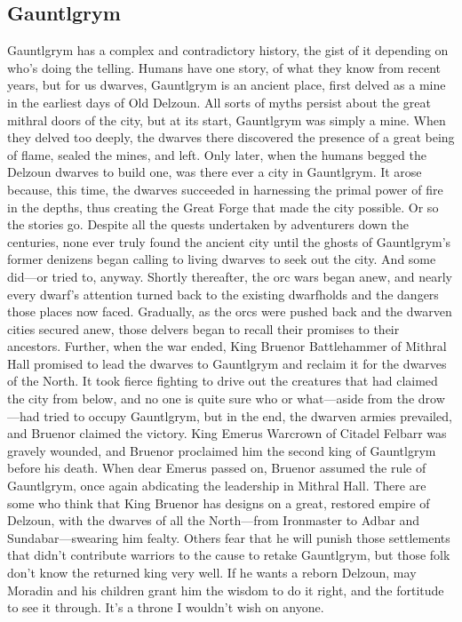 \documentclass[10pt,a4paper,twoside,twocolumn,openany,bg=print,nodeprecatedcode]{dndbook}
\begin{document}
\subsection{Gauntlgrym}
Gauntlgrym has a complex and contradictory history, the gist of it depending on who's doing the telling. Humans have one story, of what they know from recent years, but for us dwarves, Gauntlgrym is an ancient place, first delved as a mine in the earliest days of Old Delzoun. All sorts of myths persist about the great mithral doors of the city, but at its start, Gauntlgrym was simply a mine. When they delved too deeply, the dwarves there discovered the presence of a great being of flame, sealed the mines, and left. Only later, when the humans begged the Delzoun dwarves to build one, was there ever a city in Gauntlgrym. It arose because, this time, the dwarves succeeded in harnessing the primal power of fire in the depths, thus creating the Great Forge that made the city possible. Or so the stories go.
Despite all the quests undertaken by adventurers down the centuries, none ever truly found the ancient city until the ghosts of Gauntlgrym's former denizens began calling to living dwarves to seek out the city. And some did—or tried to, anyway. Shortly thereafter, the orc wars began anew, and nearly every dwarf's attention turned back to the existing dwarfholds and the dangers those places now faced. Gradually, as the orcs were pushed back and the dwarven cities secured anew, those delvers began to recall their promises to their ancestors. Further, when the war ended, King Bruenor Battlehammer of Mithral Hall promised to lead the dwarves to Gauntlgrym and reclaim it for the dwarves of the North.
It took fierce fighting to drive out the creatures that had claimed the city from below, and no one is quite sure who or what—aside from the drow—had tried to occupy Gauntlgrym, but in the end, the dwarven armies prevailed, and Bruenor claimed the victory. King Emerus Warcrown of Citadel Felbarr was gravely wounded, and Bruenor proclaimed him the second king of Gauntlgrym before his death. When dear Emerus passed on, Bruenor assumed the rule of Gauntlgrym, once again abdicating the leadership in Mithral Hall.
There are some who think that King Bruenor has designs on a great, restored empire of Delzoun, with the dwarves of all the North—from Ironmaster to Adbar and Sundabar—swearing him fealty. Others fear that he will punish those settlements that didn't contribute warriors to the cause to retake Gauntlgrym, but those folk don't know the returned king very well. If he wants a reborn Delzoun, may Moradin and his children grant him the wisdom to do it right, and the fortitude to see it through. It's a throne I wouldn't wish on anyone.
\end{document}
